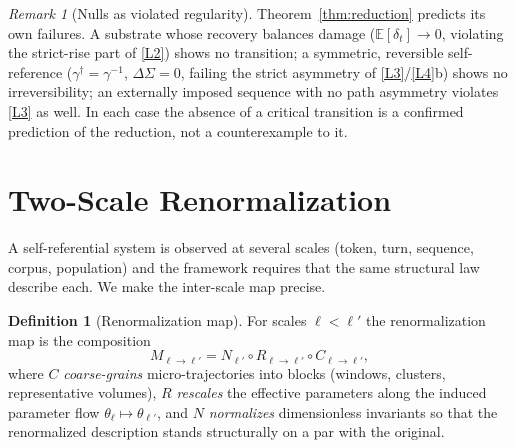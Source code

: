 \documentclass[11pt]{article}
\theoremstyle{plain}
\theoremstyle{definition}
\newtheorem{definition}[theorem]{Definition}
\theoremstyle{remark}
\newtheorem{remark}[theorem]{Remark}
\newcommand{\E}{\mathbb{E}}
\begin{document}
\begin{remark}[Nulls as violated regularity]\label{rem:nulls}
Theorem~\ref{thm:reduction} predicts its own failures. A substrate whose recovery balances damage ($\E[\delta_t]\to0$, violating the strict-rise part of \ref{L2}) shows no transition; a symmetric, reversible self-reference ($\gamma^\dagger=\gamma^{-1}$, $\Delta\Sigma=0$, failing the strict asymmetry of \ref{L3}/\ref{L4}b) shows no irreversibility; an externally imposed sequence with no path asymmetry violates \ref{L3} as well. In each case the absence of a critical transition is a confirmed prediction of the reduction, not a counterexample to it.
\end{remark}

\section{Two-Scale Renormalization}\label{sec:renorm}

A self-referential system is observed at several scales (token, turn, sequence, corpus, population) and the framework requires that the same structural law describe each. We make the inter-scale map precise.

\begin{definition}[Renormalization map]\label{def:M}
For scales $\ell<\ell'$ the renormalization map is the composition
\begin{equation}\label{eq:M}
M_{\ell\to\ell'}=N_{\ell'}\circ R_{\ell\to\ell'}\circ C_{\ell\to\ell'},
\end{equation}
where $C$ \emph{coarse-grains} micro-trajectories into blocks (windows, clusters, representative volumes), $R$ \emph{rescales} the effective parameters along the induced parameter flow $\theta_\ell\mapsto\theta_{\ell'}$, and $N$ \emph{normalizes} dimensionless invariants so that the renormalized description stands structurally on a par with the original.
\end{definition}
\end{document}
